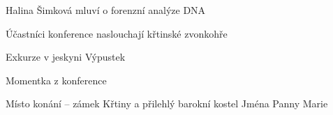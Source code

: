 
\hfil Halina Šimková mluví o forenzní analýze DNA


\newpage


\hfil Účastníci konference naslouchají křtinské zvonkohře

\vfill


\hfil Exkurze v jeskyni Výpustek


\newpage


\hfil Momentka z konference

\vfill


\hfil Místo konání -- zámek Křtiny a přilehlý barokní kostel Jména Panny Marie


